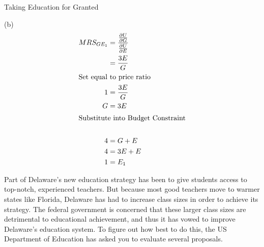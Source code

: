 \documentclass[8pt]{extarticle}
\begin{document}
\begin{problem}{Taking Education for Granted}
\begin{problem}{(b)}
\begin{align*}
        MRS_{GE_1} &= \frac{\frac{\partial U}{\partial G}}{\frac{\partial U}{\partial E}}\\
                   &= \frac{3E}{G}\\
                   \shortintertext{Set equal to price ratio}
        1 &= \frac{3E}{G}\\
        G &= 3E\\
        \shortintertext{Substitute into Budget Constraint}\\
        4 &= G + E \\
        4 &= 3E + E\\
        1 &= E_1
      \end{align*}
    \end{problem}
    Part of Delaware's new education strategy has been to give students access to top-notch, experienced teachers. But because most good teachers move to warmer states like Florida, Delaware has had to increase class sizes in order to achieve its strategy. The federal government is concerned that these larger class sizes are detrimental to educational achievement, and thus it has vowed to improve Delaware's education system. To figure out how best to do this, the US Department of Education has asked you to evaluate several proposals.


\end{problem}
\end{document}
